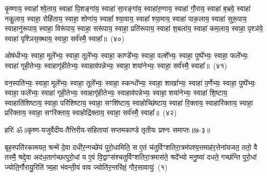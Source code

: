 {\anuvakamend[{रू॒पाय॒ स्वाहा॒ द्वे च॑}]}%

कृ॒ष्णाय॒ स्वाहा᳚ श्वे॒ताय॒ स्वाहा॑ पि॒शङ्गा॑य॒ स्वाहा॑ सा॒रङ्गा॑य॒ स्वाहा॑रु॒णाय॒ स्वाहा॑ गौ॒राय॒ स्वाहा॑ ब॒भ्रवे॒ स्वाहा॑ नकु॒लाय॒ स्वाहा॒ रोहि॑ताय॒ स्वाहा॒ शोणा॑य॒ स्वाहा᳚ श्या॒वाय॒ स्वाहा᳚ श्या॒माय॒ स्वाहा॑ पाक॒लाय॒ स्वाहा॑ सुरू॒पाय॒ स्वाहानु॑रूपाय॒ स्वाहा॒ विरू॑पाय॒ स्वाहा॒ सरू॑पाय॒ स्वाहा॒ प्रति॑रूपाय॒ स्वाहा॑ श॒बला॑य॒ स्वाहा॑ कम॒लाय॒ स्वाहा॒ पृश्ञ॑ये॒ स्वाहा॑ पृश्ञिस॒क्थाय॒ स्वाहा॒ सर्व॑स्मै॒ स्वाहा᳚॥~(४०)

{\anuvakamend[{कृ॒ष्णाय॒ षट्च॑त्वारिꣳशत्}]}%

ओष॑धीभ्यः॒ स्वाहा॒ मूले᳚भ्यः॒ स्वाहा॒ तूले᳚भ्यः॒ स्वाहा॒ काण्डे᳚भ्यः॒ स्वाहा॒ वल्\mbox{}शे᳚भ्यः॒ स्वाहा॒ पुष्पे᳚भ्यः॒ स्वाहा॒ फले᳚भ्यः॒ स्वाहा॑ गृही॒तेभ्यः॒ स्वाहागृ॑हीतेभ्यः॒ स्वाहाव॑पन्नेभ्यः॒ स्वाहा॒ शया॑नेभ्यः॒ स्वाहा॒ सर्व॑स्मै॒ स्वाहा᳚॥~(४१)

{\anuvakamend[{ओष॑धीभ्य॒श्चतु॑र्विꣳशतिः}]}%

वन॒स्पति॑भ्यः॒ स्वाहा॒ मूले᳚भ्यः॒ स्वाहा॒ तूले᳚भ्यः॒ स्वाहा॒ स्कन्धो᳚भ्यः॒ स्वाहा॒ शाखा᳚भ्यः॒ स्वाहा॑ प॒र्णेभ्यः॒ स्वाहा॒ पुष्पे᳚भ्यः॒ स्वाहा॒ फले᳚भ्यः॒ स्वाहा॑ गृही॒तेभ्यः॒ स्वाहागृ॑हीतेभ्यः॒ स्वाहाव॑पन्नेभ्यः॒ स्वाहा॒ शया॑नेभ्यः॒ स्वाहा॑ शि॒ष्टाय॒ स्वाहाति॑शिष्टाय॒ स्वाहा॒ परि॑शिष्टाय॒ स्वाहा॒ सꣳशि॑ष्टाय॒ स्वाहोच्छि॑ष्टाय॒ स्वाहा॑ रि॒क्ताय॒ स्वाहारि॑क्ताय॒ स्वाहा॒ प्ररि॑क्ताय॒ स्वाहा॒ सꣳरि॑क्ताय॒ स्वाहोद्रि॑क्ताय॒ स्वाहा॒ सर्व॑स्मै॒ स्वाहा᳚॥~(४२)

{\anuvakamend[{वन॒स्पति॑भ्यः॒ स्कन्धो᳚भ्यः शि॒ष्टाय॑ रि॒क्ताय॒ षट्च॑त्वारिꣳशत्}]}%

{हरिः॑ ॐ}{॥कृष्ण-यजुर्वेदीय-तैत्तिरीय-संहितायां सप्तमकाण्डे तृतीयः प्रश्नः समाप्तः॥७-३॥}

\setcounter{anuvakam}{0}
बृह॒स्पति॑रकामयत॒ श्रन्मे॑ दे॒वा दधी॑र॒न्गच्छे॑यं पुरो॒धामिति॒ स ए॒तं च॑तुर्विꣳशतिरा॒त्रम॑पश्य॒त्तमाह॑र॒त्तेना॑यजत॒ ततो॒ वै तस्मै॒ श्रद्दे॒वा अद॑ध॒ताग॑च्छत्पुरो॒धां य ए॒वं वि॒द्वाꣳस॑श्चतुर्विꣳशतिरा॒त्रमास॑ते॒ श्रदे᳚भ्यो मनु॒ष्या॑ दधते॒ गच्छ॑न्ति पुरो॒धां ज्योति॒र्गौरायु॒रिति॑ त्र्य॒हा भ॑वन्ती॒यं वाव ज्योति॑र॒न्तरि॑क्षं॒ गौर॒सावायुः॑~(१)

